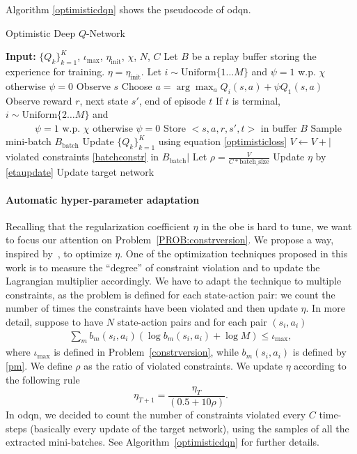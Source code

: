 Algorithm \ref{optimisticdqn} shows the pseudocode of \gls{odqn}. 
\begin{algorithm}[t]
	\caption{Optimistic Deep $Q$-Network}
	\label{optimisticdqn}
	\begin{algorithmic}
		\STATE \textbf{Input:} $\{Q_k\}_{k=1}^K$, $\iota_{\max}$, $\eta_{\mathrm{init}}$, $\chi$, $N$, $C$
		\STATE Let $B$ be a replay buffer storing the experience for training.
		\STATE $\eta = \eta_{\mathrm{init}}$.
		\STATE Let $i \sim \mathrm{Uniform}\{1 \dots M\}$ and $\psi = 1$ w.p. $\chi$ otherwise $\psi = 0$
		\STATE Observe $s$
		\STATE Choose $a = \arg \max_a Q_i(s,a) + \psi Q_1(s,a)$
		\STATE Observe reward $r$, next state $s'$, end of episode $t$
		\STATE If $t$ is terminal, $i \sim \mathrm{Uniform}\{2 \dots M\}$ and \\ \ \ \ \ \ \ $\psi = 1$ w.p. $\chi$ otherwise $\psi=0$
		\STATE Store $<s,a,r,s',t>$ in buffer $B$
		\STATE Sample mini-batch $B_{\mathrm{batch}}$
		\STATE Update $\{Q_k\}_{k=1}^K$ using equation \eqref{optimisticloss}
		\STATE $V \leftarrow V + |$ violated constraints \eqref{batchconstr} in $B_{\mathrm{batch}}|$ 
		\ENDFOR
		\STATE Let $\rho = \frac{V}{C * \mathrm{batch\_size}}$
		\STATE Update $\eta$ by \eqref{etaupdate}
		\STATE Update target network
		\ENDFOR
	\end{algorithmic}
\end{algorithm}

\paragraph{Automatic hyper-parameter adaptation}
\label{subsec:adaptive}
Recalling that the regularization coefficient $\eta$ in the \gls{obe} is hard to tune, we want to focus our attention on Problem~\ref{PROB:constrversion}. We propose a way, inspired by~\cite{schulman2017proximal}, to optimize $\eta$.
One of the optimization techniques proposed in this work is to measure the ``degree'' of constraint violation and to update the Lagrangian multiplier accordingly. We have to adapt the technique to multiple constraints, as the problem is defined for each state-action pair: we count the number of times the constraints have been violated and then update $\eta$. In more detail, suppose to have $N$ state-action pairs and for each pair $(s_i, a_i)$
\begin{eqnarray}
\sum_m b_m(s_i,a_i) (\log b_m(s_i,a_i) + \log M) \leq \iota_{\max}, \label{batchconstr}
\end{eqnarray}
where $\iota_{\max}$ is defined in Problem~\ref{constrversion}, while $b_m(s_i,a_i)$ is defined by \eqref{pm}. We define $\rho$ as the ratio of violated constraints. We update $\eta$ according to the following rule
\begin{equation}
\eta_{T+1} = \frac{\eta_{T}}{(0.5 +  10 \rho)} \label{etaupdate}.
\end{equation}
In \gls{odqn}, we decided to count the number of constraints violated every $C$ time-steps (basically every update of the target network), using the samples of all the extracted mini-batches. See Algorithm~\ref{optimisticdqn} for further details.  
  
